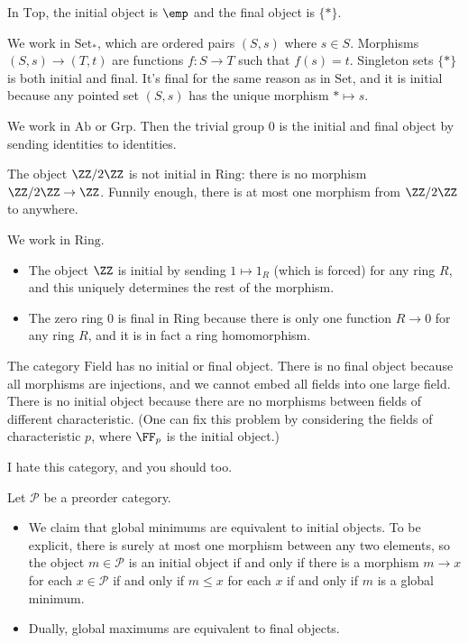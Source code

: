 \begin{example}
	In $\mathrm{Top}$, the initial object is $\emp$ and the final object is $\{*\}$.
\end{example}
\begin{example}
	We work in $\mathrm{Set}_*$, which are ordered pairs $(S,s)$ where $s\in S$. Morphisms $(S,s)\to(T,t)$ are functions $f:S\to T$ such that $f(s)=t$. Singleton sets $\{*\}$ is both initial and final. It's final for the same reason as in $\mathrm{Set}$, and it is initial because any pointed set $(S,s)$ has the unique morphism $*\mapsto s$.
\end{example}
\begin{example}
	We work in $\mathrm{Ab}$ or $\mathrm{Grp}$. Then the trivial group $0$ is the initial and final object by sending identities to identities.
\end{example}
\begin{nex}
	The object $\ZZ/2\ZZ$ is not initial in $\mathrm{Ring}$: there is no morphism $\ZZ/2\ZZ\to\ZZ$. Funnily enough, there is at most one morphism from $\ZZ/2\ZZ$ to anywhere.
\end{nex}
\begin{nex}
	We work in $\mathrm{Ring}$.
	\begin{itemize}
		\item The object $\ZZ$ is initial by sending $1\mapsto1_R$ (which is forced) for any ring $R$, and this uniquely determines the rest of the morphism.
		\item The zero ring $0$ is final in $\mathrm{Ring}$ because there is only one function $R\to0$ for any ring $R$, and it is in fact a ring homomorphism.
	\end{itemize}
\end{nex}
\begin{example}
	The category $\mathrm{Field}$ has no initial or final object. There is no final object because all morphisms are injections, and we cannot embed all fields into one large field. There is no initial object because there are no morphisms between fields of different characteristic. (One can fix this problem by considering the fields of characteristic $p$, where $\FF_p$ is the initial object.)
\end{example}
\begin{quot}
	I hate this category, and you should too.
\end{quot}
\begin{example}
	Let $\mathcal P$ be a preorder category.
	\begin{itemize}
		\item We claim that global minimums are equivalent to initial objects. To be explicit, there is surely at most one morphism between any two elements, so the object $m\in\mathcal P$ is an initial object if and only if there is a morphism $m\to x$ for each $x\in\mathcal P$ if and only if $m\le x$ for each $x$ if and only if $m$ is a global minimum.
		\item Dually, global maximums are equivalent to final objects.
	\end{itemize}
\end{example}
